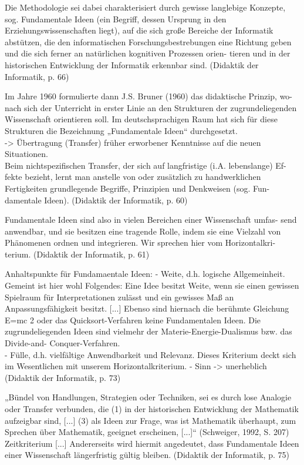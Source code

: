 \hrulefill

Die  Methodologie sei dabei charakterisiert 
durch gewisse langlebige Konzepte, sog. Fundamentale Ideen (ein Begriff, dessen 
Ursprung in den Erziehungswissenschaften liegt), auf die sich große Bereiche 
der Informatik abstützen, die den informatischen Forschungsbestrebungen eine 
Richtung geben und die sich ferner an natürlichen kognitiven Prozessen orien-
tieren und in der historischen Entwicklung der Informatik erkennbar sind. 
(Didaktik der Informatik, p. 66)

Im Jahre 1960 formulierte dann J.S. Bruner (1960) das didaktische Prinzip, wo-
nach sich der Unterricht in erster Linie an den Strukturen der zugrundeliegenden 
Wissenschaft  orientieren  soll.  Im  deutschsprachigen  Raum  hat  sich  für  diese 
Strukturen die Bezeichnung „Fundamentale Ideen“ durchgesetzt. \\
-> Übertragung (Transfer) früher erworbener Kenntnisse auf die neuen Situationen.\\
Beim nichtspezifischen Transfer, der sich auf langfristige (i.A. lebenslange) Ef-
fekte  bezieht,  lernt  man  anstelle  von  oder  zusätzlich  zu  handwerklichen 
Fertigkeiten grundlegende Begriffe, Prinzipien und Denkweisen (sog. Fun-
damentale Ideen).
(Didaktik der Informatik, p. 60)

Fundamentale  Ideen  sind  also  in  vielen  Bereichen  einer  Wissenschaft  umfas-
send anwendbar, und sie besitzen eine tragende Rolle, indem sie eine Vielzahl 
von Phänomenen ordnen und integrieren. Wir sprechen hier vom Horizontalkri-
terium.
(Didaktik der Informatik, p. 61)

Anhaltspunkte für Fundamaentale Ideen:
-  Weite, d.h. logische Allgemeinheit. Gemeint ist hier wohl Folgendes: Eine 
Idee besitzt Weite, wenn sie einen gewissen Spielraum für Interpretationen 
zulässt und ein gewisses Maß an Anpassungsfähigkeit besitzt. [...] 
Ebenso sind hiernach die berühmte Gleichung E=mc 2  oder das 
Quicksort-Verfahren  keine  Fundamentalen  Ideen.  Die  zugrundeliegenden 
Ideen sind vielmehr der Materie-Energie-Dualismus bzw. das Divide-and-
Conquer-Verfahren. \\
-  Fülle, d.h. vielfältige Anwendbarkeit und Relevanz. Dieses Kriterium deckt 
sich im Wesentlichen mit unserem Horizontalkriterium. 
- Sinn -> unerheblich
(Didaktik der Informatik, p. 73)

„Bündel von Handlungen, Strategien oder Techniken, sei es durch lose Analogie oder 
Transfer verbunden, die 
(1) in der historischen Entwicklung der Mathematik aufzeigbar sind, [...] 
(3) als Ideen zur Frage, was ist Mathematik überhaupt, zum Sprechen über Mathematik, 
geeignet erscheinen, [...]“ (Schweiger, 1992, S. 207) \\
Zeitkriterium [...] Andererseits  wird  hiermit  angedeutet,  dass  Fundamentale  Ideen 
einer Wissenschaft längerfristig gültig bleiben. 
(Didaktik der Informatik, p. 75)

